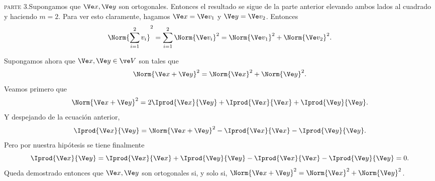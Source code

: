 \begin{sol}
    \textsc{parte} 3.\quad Supongamos que $\Ve x,\Ve y$ son ortogonales. Entonces el resultado se sigue de la parte anterior elevando ambos lados al cuadrado y haciendo $m=2$. Para ver esto claramente, hagamos $\Ve x=\Ve v_1$ y $\Ve y=\Ve v_2$. Entonces
    \[ \Norm{\sum_{i=1}^{2} v_i}^2 = \sum_{i=1}^{2} \Norm{\Ve v_i}^2  = \Norm{\Ve v_1}^2+\Norm{\Ve v_2}^2. \]
    
    Supongamos ahora que $\Ve x,\Ve y\in\ve V$ son tales que 
   \[ \Norm{\Ve x+\Ve y}^2 = \Norm{\Ve x}^2+\Norm{\Ve y}^2. \]
   Veamos primero que
   \[ \Norm{\Ve x+\Ve y}^2 = 2\Iprod{\Ve x}{\Ve y} +\Iprod{\Ve x}{\Ve x}+\Iprod{\Ve y}{\Ve y}. \]
   Y despejando de la ecuación anterior,
   \[ \Iprod{\Ve x}{\Ve y} = \Norm{\Ve x+\Ve y}^2-\Iprod{\Ve x}{\Ve x}-\Iprod{\Ve y}{\Ve y}. \]
   Pero por nuestra hipótesis se tiene finalmente
   \[ \Iprod{\Ve x}{\Ve y} = \Iprod{\Ve x}{\Ve x}+\Iprod{\Ve y}{\Ve y}-\Iprod{\Ve x}{\Ve x}-\Iprod{\Ve y}{\Ve y} =0.\]
   Queda demostrado entonces que $\Ve x,\Ve y$ son ortogonales si, y solo si, $\Norm{\Ve x+\Ve y}^2 = \Norm{\Ve x}^2+\Norm{\Ve y}^2$.
	\end{sol}
